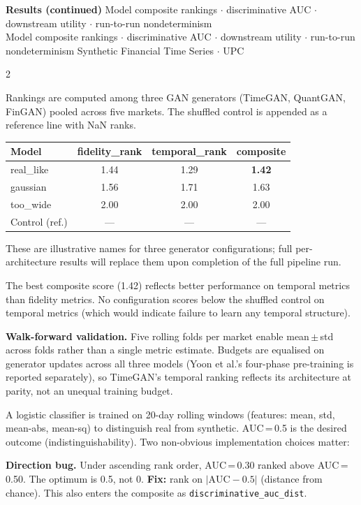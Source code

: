 \documentclass[10pt]{article}
\newcommand{\navybox}[2]{\begin{tcolorbox}[mybox={Navy}{LBg},title={#1}]#2\end{tcolorbox}}
\newcommand{\skybox}[2]{\begin{tcolorbox}[mybox={Sky}{BBg},title={#1}]#2\end{tcolorbox}}
\newcommand{\pagehead}[2]{%
  \begin{tcolorbox}[enhanced,arc=0pt,outer arc=0pt,boxrule=0pt,
    colback=Navy,colframe=Navy,
    top=5pt,bottom=5pt,left=8pt,right=8pt,
    before skip=0pt,after skip=10pt]
  {\color{white}\large\bfseries #1}%
  \ifx\relax#2\relax\else\\[1pt]{\color{blue!30!white}\small #2}\fi
  \hfill{\color{blue!20!white}\footnotesize Synthetic Financial Time Series $\cdot$ UPC}
  \end{tcolorbox}}
\begin{document}
\clearpage

\pagehead{Results (continued)}
         {Model composite rankings $\cdot$ discriminative AUC $\cdot$ downstream utility $\cdot$ run-to-run nondeterminism}

\begin{multicols}{2}

\navybox{Model Composite Rankings (Table~3)}{%
Rankings are computed among three GAN generators (TimeGAN, QuantGAN, FinGAN) pooled across five markets. The shuffled control is appended as a reference line with NaN ranks.

\smallskip
\begin{tabular}{@{}lccc@{}}
\toprule
Model & fidelity\_rank & temporal\_rank & composite \\
\midrule
real\_like  & 1.44 & 1.29 & \textbf{1.42} \\
gaussian    & 1.56 & 1.71 & 1.63 \\
too\_wide   & 2.00 & 2.00 & 2.00 \\
\midrule
Control (ref.) & --- & --- & --- \\
\bottomrule
\end{tabular}

\smallskip
These are illustrative names for three generator configurations; full per-architecture results will replace them upon completion of the full pipeline run.

The best composite score (1.42) reflects better performance on temporal metrics than fidelity metrics. No configuration scores below the shuffled control on temporal metrics (which would indicate failure to learn any temporal structure).

\textbf{Walk-forward validation.} Five rolling folds per market enable mean\,$\pm$\,std across folds rather than a single metric estimate. Budgets are equalised on generator updates across all three models (Yoon et al.'s four-phase pre-training is reported separately), so TimeGAN's temporal ranking reflects its architecture at parity, not an unequal training budget.}

\skybox{Discriminative AUC: Null Calibration and Direction Bug}{%
A logistic classifier is trained on 20-day rolling windows (features: mean, std, mean-abs, mean-sq) to distinguish real from synthetic. AUC\,=\,0.5 is the desired outcome (indistinguishability). Two non-obvious implementation choices matter:

\medskip
\textbf{Direction bug.} Under ascending rank order, AUC\,=\,0.30 ranked above AUC\,=\,0.50. The optimum is 0.5, not 0. \textbf{Fix:} rank on $|\text{AUC} - 0.5|$ (distance from chance). This also enters the composite as \texttt{discriminative\_auc\_dist}.

}
\end{multicols}
\end{document}
